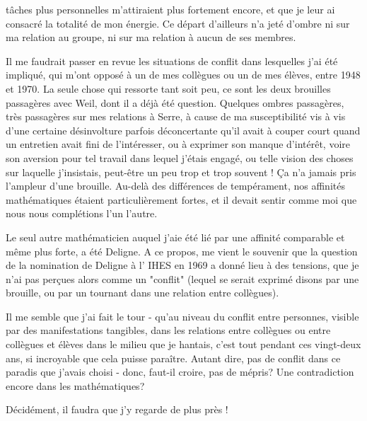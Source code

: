 tâches plus personnelles m'attiraient plus fortement encore, et que je leur ai consacré la totalité de mon énergie. Ce départ d'ailleurs n'a jeté d'ombre ni sur ma relation au groupe, ni sur ma relation à aucun de ses membres.

Il me faudrait passer en revue les situations de conflit dans lesquelles j'ai été impliqué, qui m'ont opposé à un de mes collègues ou un de mes élèves, entre 1948 et 1970. La seule chose qui ressorte tant soit peu, ce sont les deux brouilles passagères avec Weil, dont il a déjà été question. Quelques ombres passagères, très passagères sur mes relations à Serre, à cause de ma susceptibilité vis à vis d'une certaine désinvolture parfois déconcertante qu'il avait à couper court quand un entretien avait fini de l'intéresser, ou à exprimer son manque d'intérêt, voire son aversion pour tel travail dans lequel j'étais engagé, ou telle vision des choses sur laquelle j'insistais, peut-être un peu trop et trop souvent ! Ça n'a jamais pris l'ampleur d'une brouille. Au-delà des différences de tempérament, nos affinités mathématiques étaient particulièrement fortes, et il devait sentir comme moi que nous nous complétions l'un l'autre.

Le seul autre mathématicien auquel j'aie été lié par une affinité comparable et même plus forte, a été Deligne. A ce propos, me vient le souvenir que la question de la nomination de Deligne à l' IHES en 1969 a donné lieu à des tensions, que je n'ai pas perçues alors comme un "conflit" (lequel se serait exprimé disons par une brouille, ou par un tournant dans une relation entre collègues).

Il me semble que j'ai fait le tour - qu'au niveau du conflit entre personnes, visible par des manifestations tangibles, dans les relations entre collègues ou entre collègues et élèves dans le milieu que je hantais, c'est tout pendant ces vingt-deux ans, si incroyable que cela puisse paraître. Autant dire, pas de conflit dans ce paradis que j'avais choisi - donc, faut-il croire, pas de mépris? Une contradiction encore dans les mathématiques?

Décidément, il faudra que j'y regarde de plus près !


